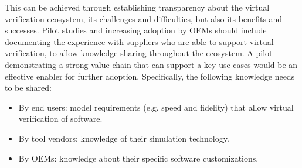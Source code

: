 This can be achieved through establishing transparency about the virtual verification ecosystem, its challenges and difficulties, but also its benefits and successes. 
Pilot studies and increasing adoption by OEMs should include documenting the experience with suppliers who are able to support virtual verification, to allow knowledge sharing throughout the ecosystem.
A pilot demonstrating a strong value chain that can support a key use cases would be an effective enabler for further adoption.
Specifically, the following knowledge needs to be shared:
\begin{itemize}
  \item By end users: model requirements (e.g. speed and fidelity) that allow virtual verification of software.
  \item By tool vendors: knowledge of their simulation technology.
  \item By OEMs: knowledge about their specific software customizations.
\end{itemize}